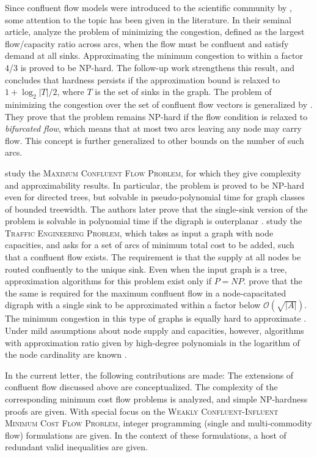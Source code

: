 \documentclass[pdflatex,sn-mathphys-num]{sn-jnl}%
\theoremstyle{thmstyleone}%
\begin{document}
Since confluent flow models were introduced to the scientific community by \citet{chen06,chen07}, some attention to the topic has been given in the literature.
In their seminal article, \citet{chen06} analyze the problem of minimizing the congestion, defined as the largest flow/capacity ratio across arcs,
when the flow must be confluent and satisfy demand at all sinks.
Approximating the minimum congestion to within a factor 4/3 is proved to be NP-hard.
The follow-up work \citep{chen07} strengthens this result, and concludes that hardness persists if the approximation bound is relaxed to $1+\log_2{|T|}/2$,
where $T$ is the set of sinks in the graph.
The problem of minimizing the congestion over the set of confluent flow vectors is generalized by \citet{donovan07}.
They prove that the problem remains NP-hard if the flow condition is relaxed to \emph{bifurcated flow}, which means that at most two arcs leaving any node may carry flow.
This concept is further generalized to other bounds on the number of such arcs.

\citet{dressler10} study the \textsc{Maximum Confluent Flow Problem}, for which they give complexity and approximability results.
In particular, the problem is proved to be NP-hard even for directed trees, but solvable in pseudo-polynomial time for graph classes of bounded treewidth.
The authors later prove that the single-sink version of the problem is solvable in polynomial time if the digraph is outerplanar \citep{dressler14}.
\citet{bhatia08} study the \textsc{Traffic Engineering Problem}, which takes as input a graph with node capacities, and asks for a set of arcs of minimum total cost to be added,
such that a confluent flow exists.
The requirement is that the supply at all nodes be routed confluently to the unique sink.
Even when the input graph is a tree, approximation algorithms for this problem exist only if $P=NP$.
\citet{shepherd15b} prove that the the same is required for the maximum confluent flow in a node-capacitated digraph with a single sink to be approximated within a factor below $\mathcal{O}(\sqrt{|A|})$.
The minimum congestion in this type of graphs is equally hard to approximate \cite{shepherd15b}.
Under mild assumptions about node supply and capacities, however, algorithms with approximation ratio given by high-degree polynomials in the logarithm of the node cardinality are known \cite{shepherd15a}.

In the current letter, the following contributions are made: The extensions of confluent flow discussed above are conceptualized.
The complexity of the corresponding minimum cost flow problems is analyzed, and simple NP-hardness proofs are given.
With special focus on the \textsc{Weakly Confluent-Influent Minimum Cost Flow Problem}, integer programming (single and multi-commodity flow) formulations are given.
In the context of these formulations, a host of redundant valid inequalities are given.
\end{document}
